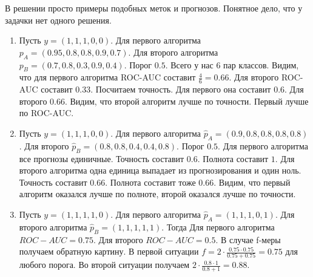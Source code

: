 \documentclass[12pt, a4paper, oneside]{article}
\theoremstyle{plain} %
\theoremstyle{definition}
\begin{document}
\begin{solution} 
В решении просто примеры подобных меток и прогнозов. Понятное дело, что у задачки нет одного решения. 
\begin{enumerate}

	\item Пусть $y = (1,1,1,0,0)$. Для первого алгоритма $p_A = (0.95, 0.8, 0.8, 0.9, 0.7)$. Для второго алгоритма $p_B = (0.7, 0.8, 0.3, 0.9, 0.4)$. Порог $0.5$. Всего у нас $6$ пар классов. Видим, что для первого алгоритма ROC-AUC составит $\frac{4}{6} = 0.66$. Для второго ROC-AUC составит $0.33$.  Посчитаем точность. Для первого она составит $0.6$. Для второго $0.66$. Видим, что второй алгоритм лучше по точности. Первый лучше по ROC-AUC. 
	
	\item  Пусть $y = (1,1,1,0,0)$. Для первого алгоритма $\hat p_A = (0.9, 0.8, 0.8, 0.8, 0.8)$. Для второго $\hat p_B = (0.8,0.8,0.4,0.4,0.8)$.  Порог $0.5$. Для первого алгоритма все прогнозы единичные. Точность составит $0.6$. Полнота составит $1$. Для второго алгоритма одна единица выпадает из прогнозирования и один ноль. Точность составит $0.66$.  Полнота составит тоже $0.66$. Видим, что первый алгоритм оказался лучше по полноте, второй оказался лучше по точности.  
	
	\item  Пусть $y = (1,1,1,1,0)$. Для первого алгоритма $\hat p_A = (1,1,1,0,1)$. Для второго алгоритма $\hat p_B = (1,1,1,1,1)$. Тогда Для первого алгоритма $ROC-AUC = 0.75$. Для второго $ROC-AUC = 0.5$. В случае f-меры получаем обратную картину. В первой ситуации $f = 2 \cdot \frac{0.75 \cdot 0.75}{0.75 + 0.75} = 0.75$ для любого порога. Во второй ситуации получаем $2 \cdot \frac{0.8 \cdot 1}{0.8 + 1} =0.88$. 
\end{enumerate}
\end{solution}


\end{document}
